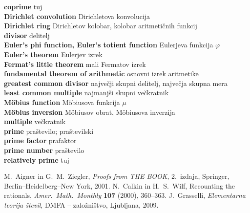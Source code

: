 \documentclass[a4paper,12pt]{article}
\newcommand{\geslo}[2]{\noindent\textbf{#1} \quad \hangindent=1cm #2\\[-1pc]}
\begin{document}
\geslo{coprime}{tuj}

\geslo{Dirichlet convolution}{Dirichletova konvolucija}

\geslo{Dirichlet ring}{Dirichletov kolobar, kolobar aritmetičnih funkcij}

\geslo{divisor}{delitelj}

\geslo{Euler's phi function, Euler's totient function}{Eulerjeva funkcija $\varphi$}

\geslo{Euler's theorem}{Eulerjev izrek}

\geslo{Fermat's little theorem}{mali Fermatov izrek}

\geslo{fundamental theorem of arithmetic}{osnovni izrek aritmetike}

\geslo{greatest common divisor}{največji skupni delitelj, največja skupna mera}

\geslo{least common multiple}{najmanjši skupni večkratnik}

\geslo{M\"obius function}{M\"obiusova funkcija $\mu$}

\geslo{M\"obius inversion}{M\"obiusov obrat, M\"obiusova inverzija}

\geslo{multiple}{večkratnik}

\geslo{prime}{praštevilo; praštevilski}

\geslo{prime factor}{prafaktor}

\geslo{prime number}{praštevilo}

\geslo{relatively prime}{tuj}




\begin{thebibliography}{1}
M.~Aigner in G.~M.~Ziegler, \emph{Proofs from THE BOOK}, 2.\ izdaja, Springer, Berlin--Heidelberg--New York, 2001.
N.~Calkin in H.~S.~Wilf, Recounting the rationals,
\emph{Amer.~Math.~Monthly}  \textbf{107}  (2000),  360--363.
J.~Grasselli, \emph{Elementarna teorija števil}, DMFA -- založništvo, Ljubljana, 2009.
\end{thebibliography}
\end{document}
